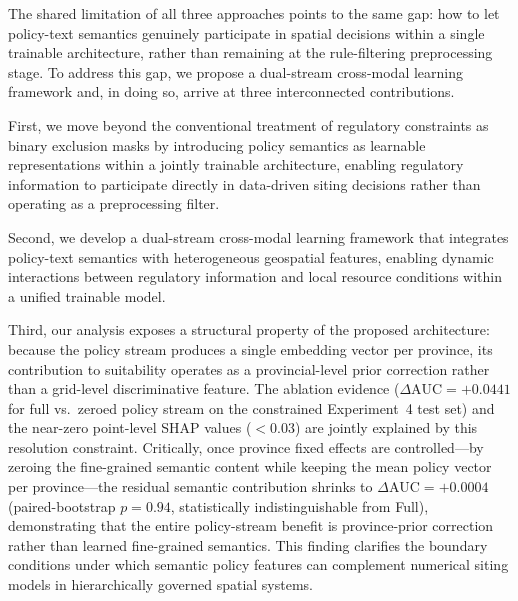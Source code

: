 \documentclass[12pt, a4paper]{article}
\begin{document}
The shared limitation of all three approaches points to the
same gap: how to let policy-text semantics genuinely participate
in spatial decisions within a single trainable architecture,
rather than remaining at the rule-filtering preprocessing stage.
To address this gap, we propose a dual-stream cross-modal
learning framework and, in doing so, arrive at three
interconnected contributions.

First, we move beyond the conventional treatment of regulatory
constraints as binary exclusion masks by introducing policy
semantics as learnable representations within a jointly
trainable architecture, enabling regulatory information to
participate directly in data-driven siting decisions rather
than operating as a preprocessing filter.

Second, we develop a dual-stream cross-modal learning framework
that integrates policy-text semantics with heterogeneous
geospatial features, enabling dynamic interactions between
regulatory information and local resource conditions within a
unified trainable model.

Third, our analysis exposes a structural property of the
proposed architecture: because the policy stream produces a
single embedding vector per province, its contribution to
suitability operates as a provincial-level prior correction
rather than a grid-level discriminative feature. The ablation
evidence ($\Delta\text{AUC}=+0.0441$ for full vs.\ zeroed
policy stream on the constrained Experiment~4 test set) and
the near-zero point-level SHAP values ($<0.03$) are jointly
explained by this resolution constraint. Critically, once
province fixed effects are controlled---by zeroing the
fine-grained semantic content while keeping the mean policy
vector per province---the residual semantic contribution
shrinks to $\Delta\text{AUC}=+0.0004$ (paired-bootstrap
$p=0.94$, statistically indistinguishable from Full),
demonstrating that the entire policy-stream benefit is
province-prior correction rather than learned fine-grained
semantics. This finding clarifies the boundary conditions
under which semantic policy features can complement numerical
siting models in hierarchically governed spatial systems.
\end{document}
